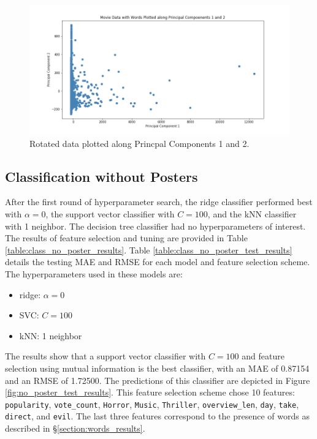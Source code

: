 \documentclass[12pt, oneside]{article}   	%
\begin{document}
\begin{figure}%
\includegraphics[width=\textwidth]{pc1_pc2}
\caption{\label{fig:pc1_pc2}Rotated data plotted along Princpal Components 1 and 2.}
\end{figure}

\subsection{Classification without Posters}
\label{section:class_no_posters_results}

After the first round of hyperparameter search, the ridge classifier performed best with $\alpha=0$, the support vector classifier with $C=100$, and the kNN classifier with 1 neighbor. The decision tree classifier had no hyperparameters of interest. The results of feature selection and tuning are provided in Table \ref{table:class_no_poster_results}. Table \ref{table:class_no_poster_test_results} details the testing MAE and RMSE for each model and feature selection scheme. The hyperparameters used in these models are:
\begin{itemize}
\item ridge: $\alpha=0$
\item SVC: $C=100$
\item kNN: 1 neighbor
\end{itemize}
The results show that a support vector classifier with $C=100$ and feature selection using mutual information is the best classifier, with an MAE of 0.87154 and an RMSE of 1.72500. The predictions of this classifier are depicted in Figure \ref{fig:no_poster_test_results}. This feature selection scheme chose 10 features: \texttt{popularity}, \texttt{vote\_count}, \texttt{Horror}, \texttt{Music}, \texttt{Thriller}, \texttt{overview\_len}, \texttt{day}, \texttt{take}, \texttt{direct}, and \texttt{evil}. The last three features correspond to the presence of words as described in \S \ref{section:words_results}.
\end{document}
